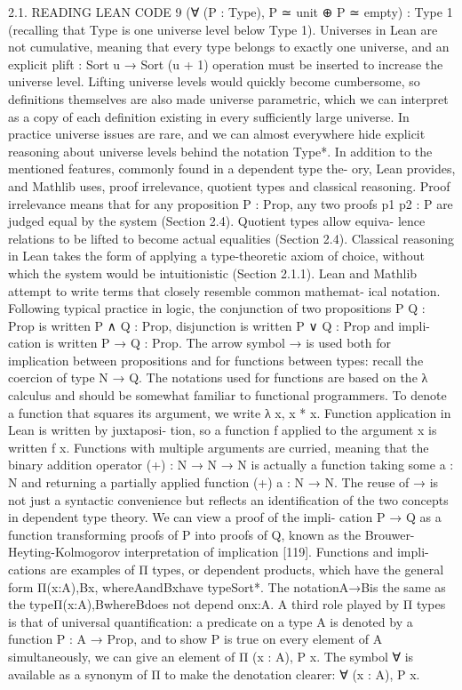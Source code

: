 \documentclass{book}
\theoremstyle{definition}
\begin{document}
2.1. READING LEAN CODE 9
(∀ (P : Type), P ≃ unit ⊕ P ≃ empty) : Type 1
 (recalling that Type is one universe level below Type 1). Universes in Lean are not cumulative, meaning that every type belongs to exactly one universe, and an explicit plift : Sort u → Sort (u + 1) operation must be inserted to increase the universe level. Lifting universe levels would quickly become cumbersome, so definitions themselves are also made universe parametric, which we can interpret as a copy of each definition existing in every suﬀiciently large universe. In practice universe issues are rare, and we can almost everywhere hide explicit reasoning about universe levels behind the notation Type*.
In addition to the mentioned features, commonly found in a dependent type the- ory, Lean provides, and Mathlib uses, proof irrelevance, quotient types and classical reasoning. Proof irrelevance means that for any proposition P : Prop, any two proofs p1 p2 : P are judged equal by the system (Section 2.4). Quotient types allow equiva- lence relations to be lifted to become actual equalities (Section 2.4). Classical reasoning in Lean takes the form of applying a type-theoretic axiom of choice, without which the system would be intuitionistic (Section 2.1.1).
Lean and Mathlib attempt to write terms that closely resemble common mathemat- ical notation. Following typical practice in logic, the conjunction of two propositions P Q : Prop is written P ∧ Q : Prop, disjunction is written P ∨ Q : Prop and impli- cation is written P → Q : Prop. The arrow symbol → is used both for implication between propositions and for functions between types: recall the coercion of type N → Q.
The notations used for functions are based on the λ calculus and should be somewhat familiar to functional programmers. To denote a function that squares its argument, we write λ x, x * x. Function application in Lean is written by juxtaposi- tion, so a function f applied to the argument x is written f x. Functions with multiple arguments are curried, meaning that the binary addition operator (+) : N → N → N is actually a function taking some a : N and returning a partially applied function (+) a : N → N.
The reuse of → is not just a syntactic convenience but reflects an identification of the two concepts in dependent type theory. We can view a proof of the impli- cation P → Q as a function transforming proofs of P into proofs of Q, known as the Brouwer-Heyting-Kolmogorov interpretation of implication [119]. Functions and impli- cations are examples of Π types, or dependent products, which have the general form Π(x:A),Bx, whereAandBxhave typeSort*. The notationA→Bis the same as the typeΠ(x:A),BwhereBdoes not depend onx:A. A third role played by Π types is that of universal quantification: a predicate on a type A is denoted by a function P : A → Prop, and to show P is true on every element of A simultaneously, we can give an element of Π (x : A), P x. The symbol ∀ is available as a synonym of Π to make the denotation clearer: ∀ (x : A), P x.
\end{document}
